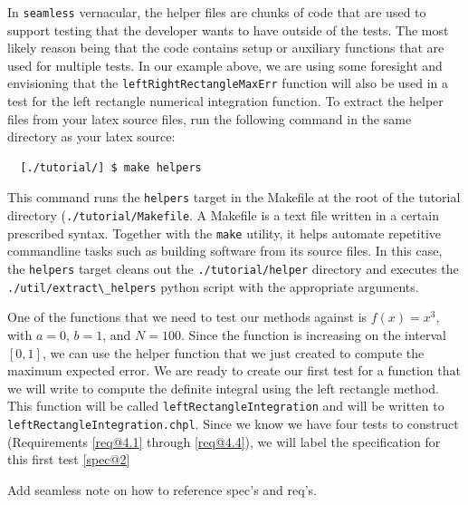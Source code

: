 \begin{seamlessnote}
  In \lstinline{seamless} vernacular, the helper files are chunks of code that are used to support
  testing that the developer wants to have outside of the tests. The most likely reason being that
  the code contains setup or auxiliary functions that are used for multiple tests. In our example
  above, we are using some foresight and envisioning that the \lstinline{leftRightRectangleMaxErr}
  function will also be used in a test for the left rectangle numerical integration function. To 
  extract the helper files from your latex source files, run the following command in the same
  directory as your latex source:
  \begin{verbatim}
  [./tutorial/] $ make helpers
  \end{verbatim}
  This command runs the \lstinline{helpers} target in the Makefile at the root of the 
  tutorial directory (\lstinline{./tutorial/Makefile}. A Makefile is a text 
    file written in a certain prescribed syntax. Together with the \lstinline{make} utility, it 
    helps automate repetitive commandline tasks such as building software from its source files. 
    In this case, the \lstinline{helpers} target cleans out the \lstinline{./tutorial/helper} directory and
    executes the \lstinline{./util/extract\_helpers} python script with the appropriate arguments.
  \end{seamlessnote}

  One of the functions that we need to test our methods against is $f(x) = x^3$, 
  with $a=0$, $b=1$, and $N=100$.
  Since the function is increasing on the interval $[0,1]$, we can use 
  the helper function that we just created to compute the maximum expected error. We are
  ready to create our first test for a function that we will write to compute the definite
  integral using the left rectangle method. This function will be called 
  \lstinline{leftRectangleIntegration}
  and will be written to \lstinline{leftRectangleIntegration.chpl}.
  Since we know we have four tests to construct (Requirements \ref{req@4.1} through \ref{req@4.4}),
  we will label the specification for this first test \ref{spec@2}
  \begin{TODO}
    Add seamless note on how to reference spec's and req's.
  \end{TODO}

